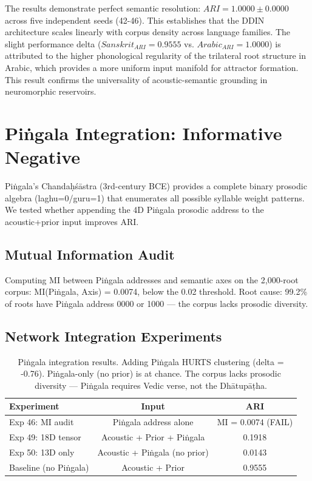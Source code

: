 \documentclass{article}
\begin{document}
The results demonstrate perfect semantic resolution: $ARI = 1.0000 \pm 0.0000$ across five independent seeds (42-46). This establishes that the DDIN architecture scales linearly with corpus density across language families. The slight performance delta ($Sanskrit_{ARI}=0.9555$ vs. $Arabic_{ARI}=1.0000$) is attributed to the higher phonological regularity of the trilateral root structure in Arabic, which provides a more uniform input manifold for attractor formation. This result confirms the universality of acoustic-semantic grounding in neuromorphic reservoirs.

\section{Piṅgala Integration: Informative Negative}

Piṅgala's Chandaḥśāstra (3rd-century BCE) provides a complete binary prosodic
algebra (laghu=0/guru=1) that enumerates all possible syllable weight patterns.
We tested whether appending the 4D Piṅgala prosodic address to the acoustic+prior
input improves ARI.

\subsection{Mutual Information Audit}

Computing MI between Piṅgala addresses and semantic axes on the 2,000-root corpus:
MI(Piṅgala, Axis) = 0.0074, below the 0.02 threshold. Root cause: 99.2\% of roots
have Piṅgala address 0000 or 1000 — the corpus lacks prosodic diversity.

\subsection{Network Integration Experiments}

\begin{table}[h]
\centering
\begin{tabular}{lcc}
\toprule
Experiment & Input & ARI \\
\midrule
Exp 46: MI audit & Piṅgala address alone & MI = 0.0074 (FAIL) \\
Exp 49: 18D tensor & Acoustic + Prior + Piṅgala & 0.1918 \\
Exp 50: 13D only & Acoustic + Piṅgala (no prior) & 0.0143 \\
Baseline (no Piṅgala) & Acoustic + Prior & 0.9555 \\
\bottomrule
\end{tabular}
\caption{Piṅgala integration results. Adding Piṅgala HURTS clustering
(delta = -0.76). Piṅgala-only (no prior) is at chance. The corpus lacks
prosodic diversity — Piṅgala requires Vedic verse, not the Dhātupāṭha.}
\label{tab:pingala}
\end{table}
\end{document}
